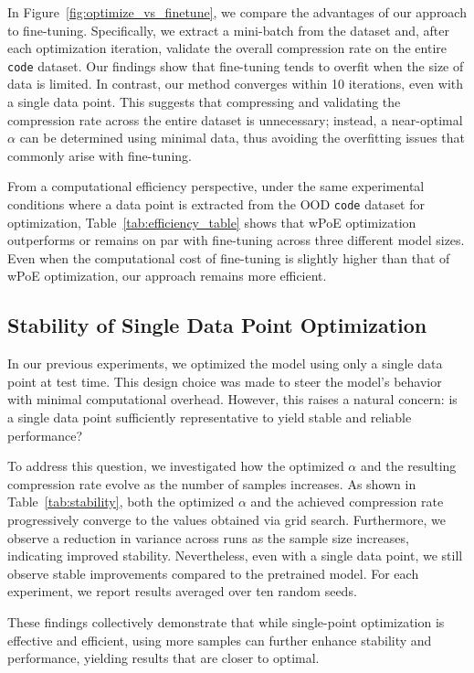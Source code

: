 \documentclass[11pt]{article}
\begin{document}
In Figure~\ref{fig:optimize_vs_finetune}, we compare the advantages of our approach to fine-tuning. 
Specifically, we extract a mini-batch from the dataset and, after each optimization iteration, validate the overall compression rate on the entire \texttt{code} dataset. 
Our findings show that fine-tuning tends to overfit when the size of data is limited. 
In contrast, our method converges within 10 iterations, even with a single data point. 
This suggests that compressing and validating the compression rate across the entire dataset is unnecessary; instead, a near-optimal $\alpha$ can be determined using minimal data, thus avoiding the overfitting issues that commonly arise with fine-tuning.

From a computational efficiency perspective, under the same experimental conditions where a data point is extracted from the OOD \texttt{code} dataset for optimization, Table~\ref{tab:efficiency_table} shows that wPoE optimization outperforms or remains on par with fine-tuning across three different model sizes. 
Even when the computational cost of fine-tuning is slightly higher than that of wPoE optimization, our approach remains more efficient.

\subsection{Stability of Single Data Point Optimization}

In our previous experiments, we optimized the model using only a single data point at test time. This design choice was made to steer the model’s behavior with minimal computational overhead. However, this raises a natural concern: is a single data point sufficiently representative to yield stable and reliable performance?

To address this question, we investigated how the optimized $\alpha$ and the resulting compression rate evolve as the number of samples increases. As shown in Table~\ref{tab:stability}, both the optimized $\alpha$ and the achieved compression rate progressively converge to the values obtained via grid search. Furthermore, we observe a reduction in variance across runs as the sample size increases, indicating improved stability. Nevertheless, even with a single data point, we still observe stable improvements compared to the pretrained model. For each experiment, we report results averaged over ten random seeds.

These findings collectively demonstrate that while single-point optimization is effective and efficient, using more samples can further enhance stability and performance, yielding results that are closer to optimal.
\end{document}

